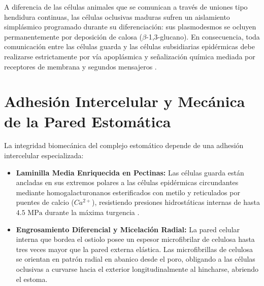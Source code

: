 \documentclass[spanish,letterpaper,oneside]{article}
\begin{document}
A diferencia de las células animales que se comunican a través de uniones tipo hendidura continuas, las células oclusivas maduras sufren un aislamiento simplásmico programado durante su diferenciación: sus plasmodesmos se ocluyen permanentemente por deposición de calosa ($\beta$-1,3-glucano). En consecuencia, toda comunicación entre las células guarda y las células subsidiarias epidérmicas debe realizarse estrictamente por vía apoplásmica y señalización química mediada por receptores de membrana y segundos mensajeros \parencite{alberts2015}.

\section{Adhesión Intercelular y Mecánica de la Pared Estomática}
La integridad biomecánica del complejo estomático depende de una adhesión intercelular especializada:
\begin{itemize}
    \item \textbf{Laminilla Media Enriquecida en Pectinas:} Las células guarda están ancladas en sus extremos polares a las células epidérmicas circundantes mediante homogalacturonanos esterificados con metilo y reticulados por puentes de calcio ($Ca^{2+}$), resistiendo presiones hidrostáticas internas de hasta $4.5\text{ MPa}$ durante la máxima turgencia \parencite{taiz2015}.
    \item \textbf{Engrosamiento Diferencial y Micelación Radial:} La pared celular interna que bordea el ostiolo posee un espesor microfibrilar de celulosa hasta tres veces mayor que la pared externa elástica. Las microfibrillas de celulosa se orientan en patrón radial en abanico desde el poro, obligando a las células oclusivas a curvarse hacia el exterior longitudinalmente al hincharse, abriendo el estoma.
\end{itemize}
\end{document}
